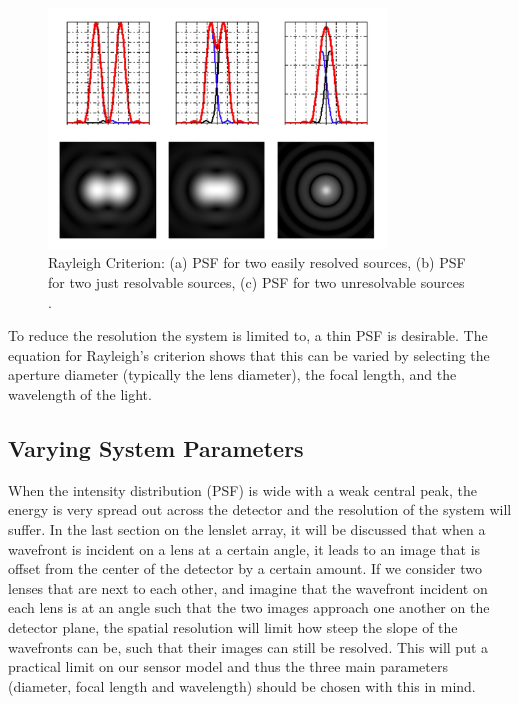 \begin{figure}[H]
	\centering
		\includegraphics[width=0.8\textwidth]{figures/RayleighCriterion.png}
	\caption{Rayleigh Criterion: (a) PSF for two easily resolved sources, (b) PSF for two just resolvable sources, (c) PSF for two unresolvable sources \cite{RayleighFigure}.}
	\label{fig:Rayleigh}
\end{figure}


To reduce the resolution the system is limited to, a thin PSF is desirable.  The equation for Rayleigh's criterion shows that this can be varied by selecting the aperture diameter (typically the lens diameter), the focal length, and the wavelength of the light.  

\subsection{Varying System Parameters}
When the intensity distribution (PSF) is wide with a weak central peak, the energy is very spread out across the detector and the resolution of the system will suffer.  In the last section on the lenslet array, it will be discussed that when a wavefront is incident on a lens at a certain angle, it leads to an image that is offset from the center of the detector by a certain amount.  If we consider two lenses that are next to each other, and imagine that the wavefront incident on each lens is at an angle such that the two images approach one another on the detector plane, the spatial resolution will limit how steep the slope of the wavefronts can be, such that their images can still be resolved.  This will put a practical limit on our sensor model and thus the three main parameters (diameter, focal length and wavelength) should be chosen with this in mind.  

